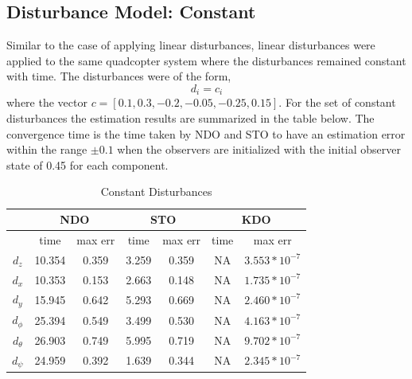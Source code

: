 \documentclass[letterpaper%
, twoside%
, 12pt%
,memoire%
, english%
,creativecommons,hyperref%
]{thETS}
\begin{document}
\subsection{Disturbance Model: Constant}
Similar to the case of applying linear disturbances, linear disturbances were applied to the same quadcopter system where the disturbances remained constant with time. The disturbances were of the form, 
\begin{equation}
d_i = c_i
\label{eq:dist_4}
\end{equation}
where the vector $c=[0.1,0.3,-0.2,-0.05,-0.25,0.15]$. 
For the set of constant disturbances the estimation results are summarized in the table below. The convergence time is the time taken by NDO and STO to have an estimation error within the range $\pm0.1$ when the observers are initialized with the initial observer state of 0.45 for each component.
\begin{table}[!htbp]
\centering
\caption{Constant Disturbances}
\begin{tabular}{*7c}
\toprule
{}  &  \multicolumn{2}{c}{NDO} & \multicolumn{2}{c}{STO} & \multicolumn{2}{c}{KDO}\\
\midrule
{}        &   time   & max err  & time  & max err& time  & max err\\
$d_z$     &  10.354 & 0.359   & 3.259  & 0.359 & NA     & $3.553*10^{-7}$\\
$d_x$     &  10.353 & 0.153   & 2.663  & 0.148 & NA     & $1.735*10^{-7}$\\
$d_y$     &  15.945 & 0.642   & 5.293  & 0.669 & NA     & $2.460*10^{-7}$\\
$d_\phi$  &  25.394 & 0.549   & 3.499  & 0.530 & NA     & $4.163*10^{-7}$\\
$d_\theta$&  26.903 & 0.749   & 5.995  & 0.719 & NA     & $9.702*10^{-7}$\\
$d_\psi$  &  24.959 & 0.392   & 1.639  & 0.344 & NA     & $2.345*10^{-7}$\\
\bottomrule
\end{tabular}
\end{table}
\end{document}
